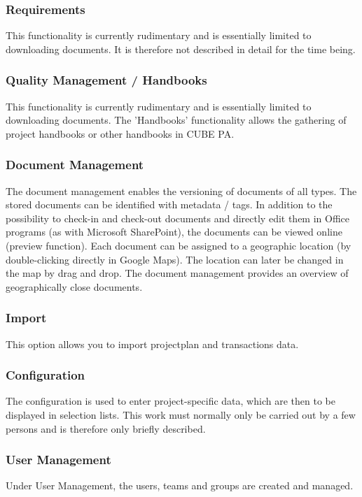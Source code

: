 \subsubsection{Requirements} %

This functionality is currently rudimentary and is essentially limited to downloading documents. It is therefore not described in detail for the time being.

\subsubsection{Quality Management / Handbooks} %

This functionality is currently rudimentary and is essentially limited to downloading documents. The 'Handbooks' functionality allows the gathering of project handbooks or other handbooks in CUBE PA.

\subsubsection{Document Management} %

The document management enables the versioning of documents of all types. The stored documents can be identified with metadata / tags. In addition to the possibility to check-in and check-out documents and directly edit them in Office programs (as with Microsoft SharePoint), the documents can be viewed online (preview function). Each document can be assigned to a geographic location (by double-clicking directly in Google Maps). The location can later be changed in the map by drag and drop. The document management provides an overview of geographically close documents.

\subsubsection{Import} %

This option allows you to import projectplan and transactions data.

\subsubsection{Configuration} %

The configuration is used to enter project-specific data, which are then to be displayed in selection lists. This work must normally only be carried out by a few persons and is therefore only briefly described.

\subsubsection{User Management} %

Under User Management, the users, teams and groups are created and managed.
